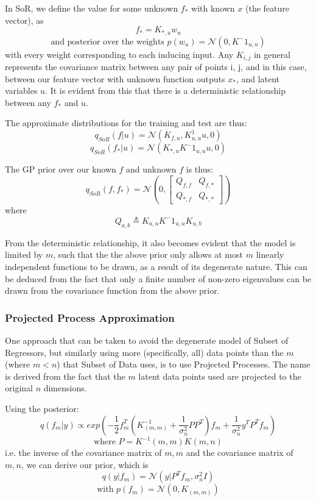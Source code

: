 \documentclass[journal]{IEEEtran}
\begin{document}
    In SoR, we define the value for some unknown $f_*$ with known $x$ (the feature vector), as $$f_* = K_{*,u}w_u$$ $$\textrm{and posterior over the weights } p(w_u) = \mathcal{N}(0, K^-1_{u,u})$$ with every weight corresponding to each inducing input. Any $K_{i, j}$ in general represents the covariance matrix between any pair of points i, j, and in this case, between our feature vector with unknown function outputs $x_*$, and latent variables $u$. It is evident from this that there is a deterministic relationship between any $f_*$ and $u$.

    The approximate distributions for the training and test are thus:
    $$q_{SoR}(f|u) = \mathcal{N}(K_{f,u},K^1_{u,u}u, 0)$$
    $$q_{SoR}(f_*|u) = \mathcal{N}(K_{*,u}K^-1_{u,u}u, 0)$$

    The GP prior over our known $f$ and unknown $f$ is thus:
    $$q_{SoR}(f, f_*) = \mathcal{N}(0, \left[
    \begin{matrix}
        Q_{f,f} & Q_{f,*} \\
        Q_{*,f} & Q_{*,*}
    \end{matrix}\right])
    $$
    where $$Q_{a,b} \triangleq K_{a,u}K^-1_{u,u}K_{u,b} $$

    From the deterministic relationship, it also becomes evident that the model is limited by $m$, such that the the above prior only allows at most $m$ linearly independent functions to be drawn, as a result of its degenerate nature. This can be deduced from the fact that only a finite number of non-zero eigenvalues can be drawn from the covariance function from the above prior.

    \subsubsection{Projected Process Approximation} 

    One approach that can be taken to avoid the degenerate model of Subset of Regressors, but similarly using more (specifically, all) data points than the $m$ (where $m < n$) that Subset of Data uses, is to use Projected Processes. The name is derived from the fact that the $m$ latent data points used are projected to the original $n$ dimensions.

    Using the posterior:
    $$ q(f_m | y) \propto exp\left( -\frac{1}{2}f^T_m(K^{-1}_{(m,m)} + \frac{1}{\sigma^2_n}PP^T)f_m + \frac{1}{\sigma^2_n}y^TP^Tf_m  \right)$$
    $$ \textrm{where } P = K^{-1}{(m,m)}K{(m,n)} $$
    i.e. the inverse of the covariance matrix of $m, m$ and the covariance matrix of $m, n$, we can derive our prior, which is
    $$ q(y|f_m) = \mathcal{N}(y|P^Tf_m,\sigma^2_nI) $$
    $$ \textrm{with } p(f_m) = \mathcal{N}(0, K_{(m,m)})$$
\end{document}
